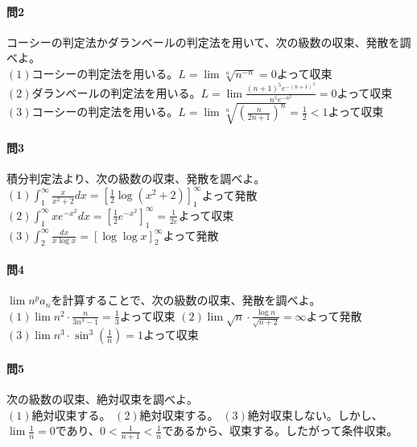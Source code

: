 \documentclass[a4j,dvipdfmx]{jsarticle}
\begin{document}
                \paragraph{問2}コーシーの判定法かダランベールの判定法を用いて、次の級数の収束、発散を調べよ。\\
                $\displaystyle(1)$コーシーの判定法を用いる。$L=\lim \sqrt[n]{n^{-n}}=0$よって収束\\
                $\displaystyle(2)$ダランベールの判定法を用いる。$L=\lim \frac{(n+1)^5e^{-(n+1)^2}}{n^5e^{-n^2}}=0$よって収束\\
                $\displaystyle(3)$コーシーの判定法を用いる。$L=\lim \sqrt[n]{\left(\frac{n}{2n+1}\right)^n}=\frac{1}{2}<1$よって収束

                \paragraph{問3}積分判定法より、次の級数の収束、発散を調べよ。\\
                $\displaystyle(1)\int_1^\infty \frac{x}{x^2+2}dx = \left[\frac{1}{2}\log(x^2+2)\right]_1^\infty$よって発散\\
                $\displaystyle(2)\int_1^\infty xe^{-x^2}dx = \left[\frac{1}{2}e^{-x^2}\right]_1^\infty=\frac{1}{2e}$よって収束\\
                $\displaystyle(3)\int_2^\infty \frac{dx}{x\log x}=\left[\log\log x\right]_2^\infty$よって発散

                \paragraph{問4}$\lim n^p a_n$を計算することで、次の級数の収束、発散を調べよ。\\
                $\displaystyle(1)\lim n^2 \cdot\frac{n}{3n^3-1}=\frac{1}{3}$よって収束\hspace{5mm}
                $\displaystyle(2)\lim \sqrt{n}\cdot\frac{\log n}{\sqrt{n+2}}=\infty$よって発散\hspace{5mm}
                $\displaystyle(3)\lim n^3\cdot \sin^3\left(\frac{1}{n}\right)=1$よって収束

                \paragraph{問5}次の級数の収束、絶対収束を調べよ。\\
                $\displaystyle(1)$絶対収束する。\hspace{5mm}
                $\displaystyle(2)$絶対収束する。\hspace{5mm}
                $\displaystyle(3)$絶対収束しない。しかし、$\lim \frac{1}{n}=0$であり、$0< \frac{1}{n+1}< \frac{1}{n}$であるから、収束する。したがって条件収束。
                
\end{document}
